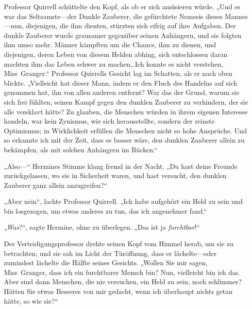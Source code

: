 Professor Quirrell schüttelte den Kopf, als ob er sich amüsieren würde.
„Und es war das Seltsamste—der Dunkle Zauberer, die gefürchtete Nemesis dieses Mannes—nun, diejenigen, die ihm dienten, stürzten sich eifrig auf ihre Aufgaben. Der dunkle Zauberer wurde grausamer gegenüber seinen Anhängern, und sie folgten ihm umso mehr. Männer kämpften um die Chance, ihm zu dienen, und diejenigen, deren Leben von diesem Helden abhing, sich entschlossen daran machten ihm das Leben schwer zu machen…Ich konnte es nicht verstehen, Miss~Granger.“
Professor Quirrells Gesicht lag im Schatten, als er nach oben blickte.
„Vielleicht hat dieser Mann, indem er den Fluch des Handelns auf sich genommen hat, ihn von allen anderen entfernt? War das der Grund, warum sie sich frei fühlten, seinen Kampf gegen den dunklen Zauberer zu verhindern, der sie alle versklavt hätte? Zu glauben, die Menschen würden in ihrem eigenen Interesse handeln, war kein Zynismus, wie sich herausstellte, sondern der reinste Optimismus; in Wirklichkeit erfüllen die Menschen nicht so hohe Ansprüche. Und so erkannte ich mit der Zeit, dass es besser wäre, den dunklen Zauberer allein zu bekämpfen, als mit solchen Anhängern im Rücken.“

„Also—“ Hermines Stimme klang fremd in der Nacht. „Du hast deine Freunde zurückgelassen, wo sie in Sicherheit waren, und hast versucht, den dunklen Zauberer ganz allein anzugreifen?“

„Aber nein“, lachte Professor Quirrell. „Ich habe aufgehört ein Held zu sein und bin losgezogen, um etwas anderes zu tun, das ich angenehmer fand.“

\emph{„Was}?“, sagte Hermine, ohne zu überlegen. „Das ist ja \emph{furchtbar}!“

Der Verteidigungsprofessor drehte seinen Kopf vom Himmel herab, um sie zu betrachten; und sie sah im Licht der Türöffnung, dass er lächelte—oder zumindest lächelte die Hälfte seines Gesichts.
„Wollen Sie mir sagen, Miss~Granger, dass ich ein furchtbarer Mensch bin? Nun, vielleicht bin ich das. Aber sind dann Menschen, die nie versuchen, ein Held zu sein, noch schlimmer? Hätten Sie etwas Besseres von mir gedacht, wenn ich überhaupt nichts getan hätte, so wie sie?“

